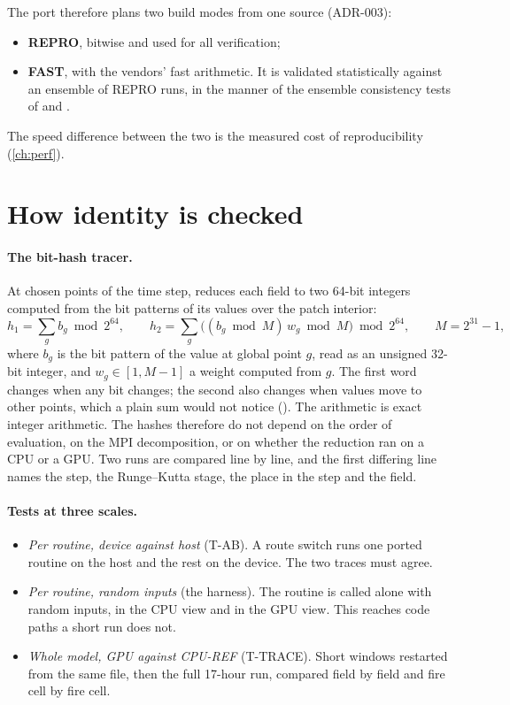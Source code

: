 The port therefore plans two build modes from one source (ADR-003):
\begin{itemize}
  \item \textbf{REPRO}, bitwise and used for all verification;
  \item \textbf{FAST}, with the vendors' fast arithmetic. It is validated statistically against an ensemble of REPRO
    runs, in the manner of the ensemble consistency tests of \citet{baker2015} and \citet{milroy2018}.
\end{itemize}
The speed difference between the two is the measured cost of reproducibility (\cref{ch:perf}).

\section{How identity is checked}

\paragraph{The bit-hash tracer.} At chosen points of the time step,  reduces each field to
two 64-bit integers computed from the bit patterns of its values over the patch interior:
\begin{equation}
  h_1 = \sum_{g} b_g \bmod 2^{64}, \qquad
  h_2 = \sum_{g} \bigl((b_g \bmod M)\, w_g \bmod M\bigr) \bmod 2^{64}, \qquad M = 2^{31} - 1,
\end{equation}
where $b_g$ is the bit pattern of the value at global point $g$, read as an unsigned 32-bit integer, and
$w_g \in [1, M-1]$ a weight computed from $g$. The first word changes when any bit changes; the second also changes
when values move to other points, which a plain sum would not notice
().
The arithmetic is exact integer arithmetic. The hashes therefore do not depend on the order of evaluation, on the
MPI decomposition, or on whether the reduction ran on a CPU or a GPU. Two runs are compared line by line, and the
first differing line names the step, the Runge--Kutta stage, the place in the step and the field.

\paragraph{Tests at three scales.}
\begin{itemize}
  \item \emph{Per routine, device against host} (T-AB). A route switch runs one ported routine on the host and the
    rest on the device. The two traces must agree.
  \item \emph{Per routine, random inputs} (the harness). The routine is called alone with random inputs, in the CPU
    view and in the GPU view. This reaches code paths a short run does not.
  \item \emph{Whole model, GPU against CPU-REF} (T-TRACE). Short windows restarted from the same file, then the full
    17-hour run, compared field by field and fire cell by fire cell.
\end{itemize}

